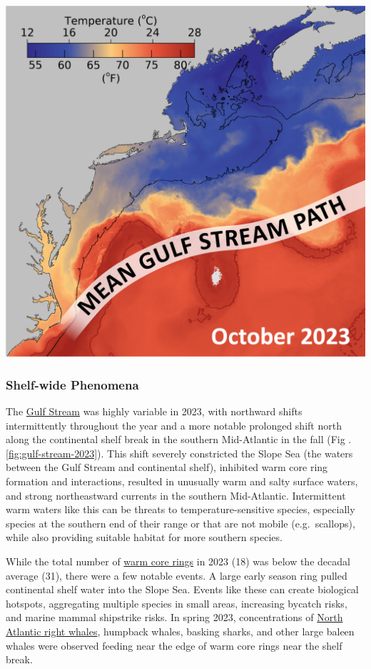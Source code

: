 \documentclass[
  10pt,
]{article}
\let\origfigure\figure
\let\endorigfigure\endfigure
\renewenvironment{figure}[1][2] {
    \expandafter\origfigure\expandafter[H]
} {
    \endorigfigure
}
\begin{document}
\begin{figure}

{\centering \includegraphics[width=0.5\linewidth]{images/MAP-SST-Gulf-Stream} 

}

\caption{Weekly mean sea surface temperature (October 8-10, 2023) with the long-term mean Gulf Stream position. Red lines represent the 26℃) (78.8°F) temperature contour.}\label{fig:gulf-stream-2023}
\end{figure}

\hypertarget{shelf-wide-phenomena}{%
\subsubsection{Shelf-wide Phenomena}\label{shelf-wide-phenomena}}

The \href{https://noaa-edab.github.io/catalog/gsi.html}{Gulf Stream} was highly variable in 2023, with northward shifts intermittently throughout the year and a more notable prolonged shift north along the continental shelf break in the southern Mid-Atlantic in the fall (Fig .\ref{fig:gulf-stream-2023}). This shift severely constricted the Slope Sea (the waters between the Gulf Stream and continental shelf), inhibited warm core ring formation and interactions, resulted in unusually warm and salty surface waters, and strong northeastward currents in the southern Mid-Atlantic. Intermittent warm waters like this can be threats to temperature-sensitive species, especially species at the southern end of their range or that are not mobile (e.g.~scallops), while also providing suitable habitat for more southern species.

While the total number of \href{https://noaa-edab.github.io/catalog/wcr.html}{warm core rings} in 2023 (18) was below the decadal average (31), there were a few notable events. A large early season ring pulled continental shelf water into the Slope Sea. Events like these can create biological hotspots, aggregating multiple species in small areas, increasing bycatch risks, and marine mammal shipstrike risks. In spring 2023, concentrations of \href{https://noaa-edab.github.io/catalog/persistent_hotspots.html}{North Atlantic right whales}, humpback whales, basking sharks, and other large baleen whales were observed feeding near the edge of warm core rings near the shelf break.
\end{document}

